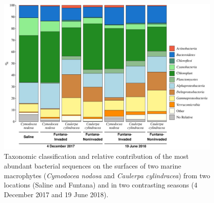 \documentclass[12pt,]{article}
\begin{document}
\begin{figure}[h]

{\centering \includegraphics[width=1\linewidth]{../results/figures/community_barplot} 

}

\caption{Taxonomic classification and relative contribution of the most abundant bacterial sequences on the surfaces of two marine macrophytes (\textit{Cymodocea nodosa} and \textit{Caulerpa cylindracea}) from two locations (Saline and Funtana) and in two contrasting seasons (4 December 2017 and 19 June 2018).\label{community}}\label{fig:unnamed-chunk-2}
\end{figure}
\end{document}
